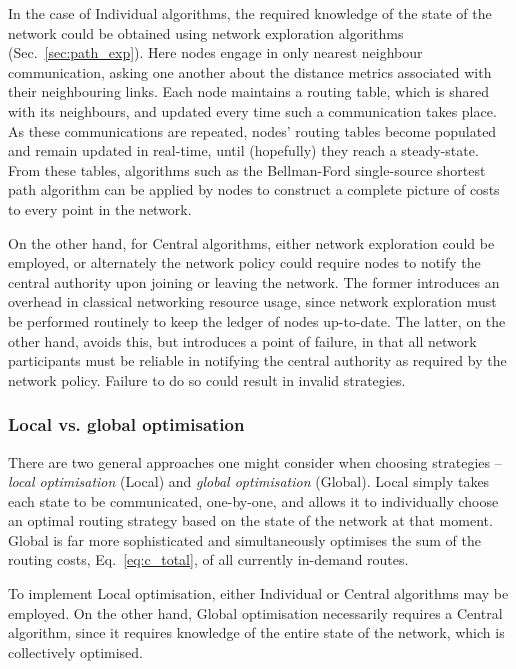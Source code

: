 \documentclass[aps,rmp,twocolumn,amsmath,amssymb,nofootinbib,superscriptaddress,longbibliography,floatfix]{revtex4-1}
\begin{document}
In the case of {\sc Individual} algorithms, the required knowledge of the state of the network could be obtained using network exploration algorithms (Sec.~\ref{sec:path_exp}). Here nodes engage in only nearest neighbour communication, asking one another about the distance metrics associated with their neighbouring links. Each node maintains a routing table, which is shared with its neighbours, and updated every time such a communication takes place. As these communications are repeated, nodes' routing tables become populated and remain updated in real-time, until (hopefully) they reach a steady-state. From these tables, algorithms such as the Bellman-Ford single-source shortest path algorithm \cite{BF} can be applied by nodes to construct a complete picture of costs to every point in the network.

On the other hand, for {\sc Central} algorithms, either network exploration could be employed, or alternately the network policy could require nodes to notify the central authority upon joining or leaving the network. The former introduces an overhead in classical networking resource usage, since network exploration must be performed routinely to keep the ledger of nodes up-to-date. The latter, on the other hand, avoids this, but introduces a point of failure, in that all network participants must be reliable in notifying the central authority as required by the network policy. Failure to do so could result in invalid strategies.

%
%

\subsubsection{Local vs. global optimisation}

There are two general approaches one might consider when choosing strategies -- \emph{local optimisation} ({\sc Local}) and \emph{global optimisation} ({\sc Global}). {\sc Local} simply takes each state to be communicated, one-by-one, and allows it to individually choose an optimal routing strategy based on the state of the network at that moment. {\sc Global} is far more sophisticated and simultaneously optimises the sum of the routing costs, Eq.~\ref{eq:c_total}, of all currently in-demand routes.

To implement {\sc Local} optimisation, either {\sc Individual} or {\sc Central} algorithms may be employed. On the other hand, {\sc Global} optimisation necessarily requires a {\sc Central} algorithm, since it requires knowledge of the entire state of the network, which is collectively optimised.
\end{document}
